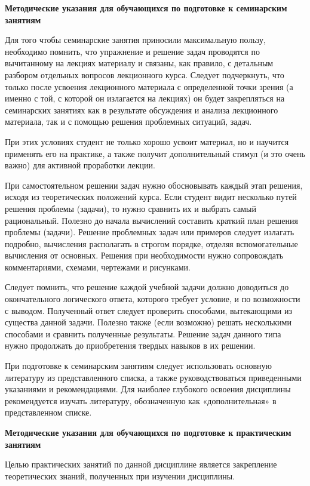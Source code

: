 \documentclass[a4paper, 12pt]{article}
\begin{document}
\vspace{8pt}
{\bf Методические указания для обучающихся по подготовке к семинарским занятиям}

Для того чтобы семинарские занятия приносили максимальную пользу, необходимо помнить, что упражнение и решение задач проводятся по вычитанному на лекциях материалу и связаны, как правило, с детальным разбором отдельных вопросов лекционного курса. Следует подчеркнуть, что только после усвоения лекционного материала с определенной точки зрения (а именно с той, с которой он излагается на лекциях) он будет закрепляться на семинарских занятиях как в результате обсуждения и анализа лекционного материала, так и с помощью решения проблемных ситуаций, задач.

При этих условиях студент не только хорошо усвоит материал, но и научится применять его на практике, а также получит дополнительный стимул (и это очень важно) для активной проработки лекции.

При самостоятельном решении задач нужно обосновывать каждый этап решения, исходя из теоретических положений курса. Если студент видит несколько путей решения проблемы (задачи), то нужно сравнить их и выбрать самый рациональный. Полезно до начала вычислений составить краткий план решения проблемы (задачи). Решение проблемных задач или примеров следует излагать подробно, вычисления располагать в строгом порядке, отделяя вспомогательные вычисления от основных. Решения при необходимости нужно сопровождать комментариями, схемами, чертежами и рисунками. 

Следует помнить, что решение каждой учебной задачи должно доводиться до  окончательного логического ответа, которого требует условие, и по возможности с выводом. Полученный ответ следует проверить способами, вытекающими из существа данной задачи. Полезно также (если возможно) решать несколькими способами и сравнить полученные результаты. Решение задач данного типа нужно продолжать до приобретения твердых навыков в их решении. 

При подготовке к семинарским занятиям следует использовать основную литературу из представленного списка, а также руководствоваться приведенными указаниями и рекомендациями. Для наиболее глубокого освоения дисциплины рекомендуется изучать литературу, обозначенную как «дополнительная» в представленном списке.

\vspace{8pt}
{\bf Методические указания для обучающихся по подготовке к практическим занятиям}

Целью практических занятий по данной дисциплине является закрепление теоретических знаний, полученных при изучении дисциплины. 
\end{document}
